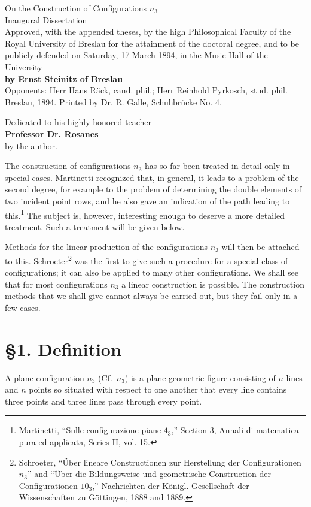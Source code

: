 \documentclass[11pt]{article}
\newcommand{\Cf}{\textup{Cf.}}
\begin{document}
\begin{center}
{\Large On the Construction of Configurations $n_3$}\\[0.5em]
{\large Inaugural Dissertation}\\[0.5em]
Approved, with the appended theses, by the high Philosophical Faculty of the Royal University of Breslau for the attainment of the doctoral degree, and to be publicly defended on Saturday, 17 March 1894, in the Music Hall of the University\\[0.5em]
\textbf{by Ernst Steinitz of Breslau}\\[0.5em]
Opponents: Herr Hans Räck, cand. phil.; Herr Reinhold Pyrkosch, stud. phil.\\[0.5em]
Breslau, 1894. Printed by Dr. R. Galle, Schuhbrücke No. 4.
\end{center}

\begin{center}
Dedicated to his highly honored teacher\\[0.3em]
\textbf{Professor Dr. Rosanes}\\[0.3em]
by the author.
\end{center}

The construction of configurations $n_3$ has so far been treated in detail only in special cases. Martinetti recognized that, in general, it leads to a problem of the second degree, for example to the problem of determining the double elements of two incident point rows, and he also gave an indication of the path leading to this.\footnote{Martinetti, “Sulle configurazione piane $4_3$,” Section 3, Annali di matematica pura ed applicata, Series II, vol. 15.} The subject is, however, interesting enough to deserve a more detailed treatment. Such a treatment will be given below.

Methods for the linear production of the configurations $n_3$ will then be attached to this. Schroeter\footnote{Schroeter, “Über lineare Constructionen zur Herstellung der Configurationen $n_3$” and “Über die Bildungsweise und geometrische Construction der Configurationen $10_3$,” Nachrichten der Königl. Gesellschaft der Wissenschaften zu Göttingen, 1888 and 1889.} was the first to give such a procedure for a special class of configurations; it can also be applied to many other configurations. We shall see that for most configurations $n_3$ a linear construction is possible. The construction methods that we shall give cannot always be carried out, but they fail only in a few cases.

\section*{\S 1. Definition}
A plane configuration $n_3$ (\Cf\ $n_3$) is a plane geometric figure consisting of $n$ lines and $n$ points so situated with respect to one another that every line contains three points and three lines pass through every point.
\end{document}
